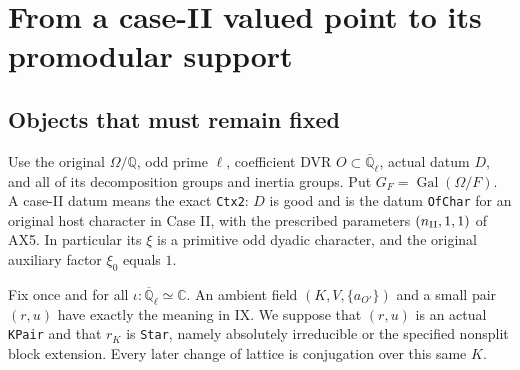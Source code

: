 \section{From a case-II valued point to its promodular support}
\label{sec:symplectic-promodular-realization}


\subsection{Objects that must remain fixed}

Use the original $\Omega/\mathbb Q$, odd prime $\ell$, coefficient
DVR $O\subset\overline{\mathbb Q}_\ell$, actual datum $D$, and all
of its decomposition groups and inertia groups.  Put $G_F=
\operatorname{Gal}(\Omega/F)$.  A case-II datum means the exact
\texttt{Ctx2}: $D$ is good and is the datum
\texttt{OfChar} for an original host character in Case II, with
the prescribed parameters $(n_{\rm II},1,1)$ of AX5.  In
particular its $\xi$ is a primitive odd dyadic character, and
the original auxiliary factor $\xi_0$ equals $1$.

Fix once and for all $\iota:\overline{\mathbb Q}_\ell\simeq
\mathbb C$.  An ambient field $(K,V,\{a_{O'}\})$ and a small
pair $(r,u)$ have exactly the meaning in IX.  We suppose that
$(r,u)$ is an actual \texttt{KPair} and that $r_K$ is
\texttt{Star}, namely absolutely irreducible or the specified
nonsplit block extension.  Every later change of lattice is
conjugation over this same $K$.

